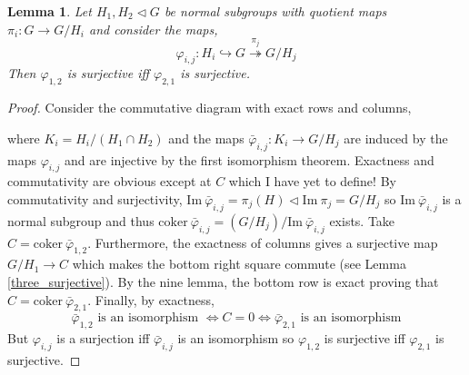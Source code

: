 \documentclass{article}
\newcommand{\coker}[0]{\mathrm{coker} \:}
\renewcommand{\Im}{\mathrm{Im} \: }
\newtheorem{lemma}[theorem]{Lemma}
\theoremstyle{definition}
\theoremstyle{definition}
\theoremstyle{remark}
\newcommand{\bphi}{\bar{\varphi}}
\begin{document}
\begin{lemma} \label{lem:surjective_quotient_maps}
Let $H_1, H_2 \triangleleft G$ be normal subgroups with quotient maps $\pi_i : G \to G / H_i$ and consider the maps,
\[ \varphi_{i,j} : H_i \hookrightarrow G \overset{\pi_j}{\twoheadrightarrow} G/H_j \]
Then $\varphi_{1,2}$ is surjective iff $\varphi_{2,1}$ is surjective. 
\end{lemma}

\begin{proof}
Consider the commutative diagram with exact rows and columns,
\begin{center}
\end{center}
where $K_i = H_i / (H_1 \cap H_2)$ and the maps $\bphi_{i,j} : K_i \to G/H_j$ are induced by the maps $\varphi_{i,j}$ and are injective by the first isomorphism theorem. Exactness and commutativity are obvious except at $C$ which I have yet to define! By commutativity and surjectivity, $\Im{\bphi_{i,j}} = \pi_j(H) \triangleleft \Im{\pi_j} = G/H_j$ so $\Im{\bphi_{i,j}}$ is a normal subgroup and thus $\coker{\bphi_{i,j}} = (G/H_j) / \Im{\bphi_{i,j}} $ exists. Take $C = \coker{\bphi_{1,2}}$. Furthermore, the exactness of columns gives a surjective map $G/H_1 \to C$ which makes the bottom right square commute (see Lemma \ref{three_surjective}). By the nine lemma, the bottom row is exact proving that $C = \coker{\bphi_{2,1}}$. Finally, by exactness, 
\[ \bphi_{1,2} \text{ is an isomorphism } \iff C = 0 \iff \bphi_{2,1} \text{ is an isomorphism}  \]
But $\varphi_{i,j}$ is a surjection iff $\bphi_{i,j}$ is an isomorphism so $\varphi_{1,2}$ is surjective iff $\varphi_{2,1}$ is surjective. 
\end{proof}
\end{document}
